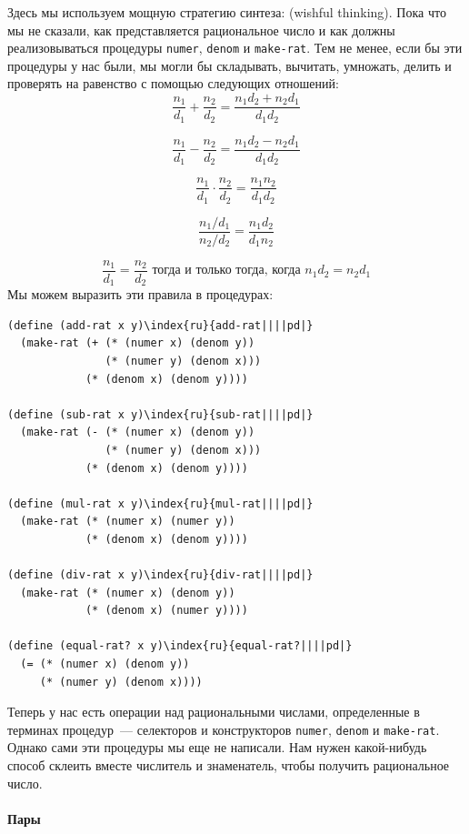 Здесь мы используем мощную стратегию синтеза: 
 (wish\-ful thin\-king). Пока что мы не
сказали, как представляется рациональное число и как должны
реализовываться процедуры {\tt numer}, {\tt denom} и
{\tt make-rat}.  Тем не менее, если бы эти процедуры у нас
были, мы могли бы складывать, вычитать, умножать, делить и проверять
на равенство с помощью следующих отношений:
$$
\frac{n_1}{d_1} + \frac{n_2}{d_2} 
        = \frac{n_1 d_2 + n_2 d_1}{d_1 d_2}
$$

$$
\frac{n_1}{d_1} - \frac{n_2}{d_2}
        = \frac{n_1 d_2 - n_2 d_1}{d_1 d_2}
$$

$$
\frac{n_1}{d_1} \cdot \frac{n_2}{d_2}
        = \frac{n_1 n_2}{d_1 d_2}
$$

$$
\frac{n_1 / d_1}{n_2 / d_2}
        = \frac{n_1 d_2}{d_1 n_2}
$$

$$
\frac{n_1}{d_1} = \frac{n_2}{d_2} \mbox{ тогда и только тогда, 
когда } n_1 d_2 = n_2 d_1
$$
Мы можем выразить эти правила в процедурах:

\begin{Verbatim}[fontsize=\small]
(define (add-rat x y)\index{ru}{add-rat||||pd|}
  (make-rat (+ (* (numer x) (denom y))
               (* (numer y) (denom x)))
            (* (denom x) (denom y))))

(define (sub-rat x y)\index{ru}{sub-rat||||pd|}
  (make-rat (- (* (numer x) (denom y))
               (* (numer y) (denom x)))
            (* (denom x) (denom y))))

(define (mul-rat x y)\index{ru}{mul-rat||||pd|}
  (make-rat (* (numer x) (numer y))
            (* (denom x) (denom y))))

(define (div-rat x y)\index{ru}{div-rat||||pd|}
  (make-rat (* (numer x) (denom y))
            (* (denom x) (numer y))))

(define (equal-rat? x y)\index{ru}{equal-rat?||||pd|}
  (= (* (numer x) (denom y))
     (* (numer y) (denom x))))
\end{Verbatim}


Теперь у нас есть операции над рациональными числами,
определенные в терминах процедур~--- селекторов и конструкторов
{\tt numer}, {\tt denom} и {\tt make-rat}.
Однако сами эти процедуры мы еще не написали.  Нам нужен какой-нибудь 
способ склеить вместе числитель и знаменатель, чтобы получить
рациональное число.

\paragraph{Пары}


